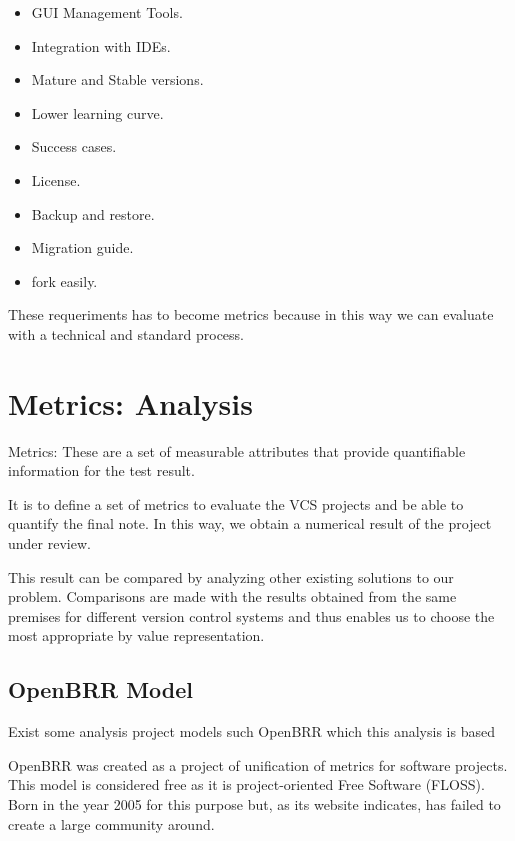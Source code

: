 \documentclass[11pt]{scrartcl}
\begin{document}
\begin{itemize}
    \item GUI Management Tools.
    \item Integration with IDEs.
    \item Mature and Stable versions.
    \item Lower learning curve.
    \item Success cases.
    \item License.
    \item Backup and restore.
    \item Migration guide.
    \item fork easily.
\end{itemize}

These requeriments has to become metrics because in this way we can evaluate with a technical and standard process.

\section{Metrics: Analysis}

Metrics: These are a set of measurable attributes that provide quantifiable information for the test result.

\par It is to define a set of metrics to evaluate the VCS projects and be able to quantify the final note. In this way, we obtain a numerical result of the project under review.

\par This result can be compared by analyzing other existing solutions to our problem.
Comparisons are made with the results obtained from the same premises for different version control systems and thus enables us to choose the most appropriate by value representation.

\subsection{OpenBRR Model}

\par Exist some analysis project models such OpenBRR which this analysis is based

\par OpenBRR was created as a project of unification of metrics for software projects. This model is considered free as it is project-oriented Free Software (FLOSS). Born in the year 2005 for this purpose but, as its website indicates, has failed to create a large community around.
\end{document}
